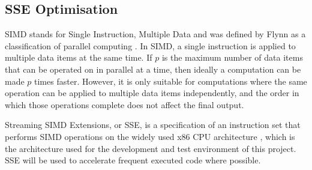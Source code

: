 \subsection{SSE Optimisation}
\label{sec:sse}

SIMD stands for Single Instruction, Multiple Data and was defined by Flynn as a classification of parallel computing \cite{flynns-taxonomy}. In SIMD, a single instruction is applied to multiple data items at the same time. If $p$ is the maximum number of data items that can be operated on in parallel at a time, then ideally a computation can be made $p$ times faster. However, it is only suitable for computations where the same operation can be applied to multiple data items independently, and the order in which those operations complete does not affect the final output.

Streaming SIMD Extensions, or SSE, is a specification of an instruction set that performs SIMD operations on the widely used x86 CPU architecture \cite{sse}, which is the architecture used for the development and test environment of this project. SSE will be used to accelerate frequent executed code where possible.